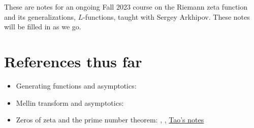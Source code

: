 \documentclass[reqno]{amsart}  \numberwithin{theorem}{section} \numberwithin{equation}{section}
\begin{document}
 
These are notes for an ongoing Fall 2023 course on the Riemann zeta function and its generalizations, $L$-functions, taught with Sergey Arkhipov.  These notes will be filled in as we go.

\section{References thus far}
\begin{itemize}
\item Generating functions and asymptotics: \cite[\S5.2]{MR2172781}
\item Mellin transform and asymptotics: \cite{zagier-mellin}
\item Zeros of zeta and the prime number theorem: \cite{Dav80}, \cite{MR2061214}, \href{https://terrytao.wordpress.com/2014/12/09/254a-notes-2-complex-analytic-multiplicative-number-theory/}{Tao's notes}
\end{itemize}
\end{document}
